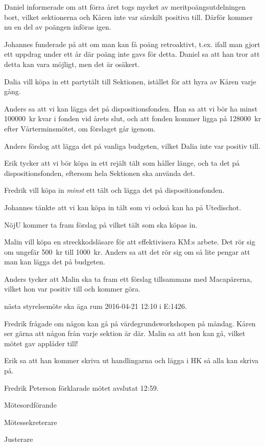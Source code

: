 \documentclass[10pt]{article}
\def\mo{Fredrik Peterson}
\def\ms{Erik Månsson}
\def\ji{Malin Lindström}
\begin{document}
\begin{paragrafer}
Daniel informerade om att förra året togs mycket av meritpoängsutdelningen bort, vilket sektionerna och Kåren inte var särskilt positiva till. Därför kommer nu en del av poängen införas igen.

Johannes funderade på att om man kan få poäng retroaktivt, t.ex. ifall man gjort ett uppdrag under ett år där poäng inte gavs för detta. Daniel sa att han tror att detta kan vara möjligt, men det är osäkert.

Dalia vill köpa in ett partytält till Sektionen, istället för att hyra av Kåren varje gång.

Anders sa att vi kan lägga det på dispositionsfonden. Han sa att vi bör ha minst \SI{100000}{kr} kvar i fonden vid årets slut, och att fonden kommer ligga på \SI{128000}{kr} efter Vårterminsmötet, om förslaget går igenom.

Anders förslog att lägga det på vanliga budgeten, vilket Dalia inte var positiv till.

Erik tycker att vi bör köpa in ett rejält tält som håller länge, och ta det på dispositionsfonden, eftersom hela Sektionen ska använda det.

Fredrik vill köpa in \emph{minst} ett tält och lägga det på dispositionsfonden.

Johannes tänkte att vi kan köpa in tält som vi också kan ha på Utedischot.

NöjU kommer ta fram förslag på vilket tält som ska köpas in.

Malin vill köpa en streckkodsläsare för att effektivisera KM:s arbete. Det rör sig om ungefär \SI{500}{kr} till \SI{1000}{kr}. Anders sa att det rör sig om så lite pengar att man kan lägga det på budgeten.

Anders tycker att Malin ska ta fram ett förslag tillsammans med Macapärerna, vilket hon var positiv till och kommer göra.

\Mba nästa styrelsemöte ska äga rum 2016-04-21 12:10 i E:1426.

\Ibfu

Fredrik frågade om någon kan gå på värdegrundsworkshopen på måndag. Kåren ser gärna att någon från varje sektion är där. Malin sa att hon kan gå, vilket mötet gav applåder till!

Erik sa att han kommer skriva ut handlingarna och lägga i HK så alla kan skriva på.

{\mo} förklarade mötet avslutat 12:59.

\end{paragrafer}

\hidesignfoot
\begin{signatures}{3}
\signature{\mo}{Mötesordförande}
\signature{\ms}{Mötessekreterare}
\signature{\ji}{Justerare}
\end{signatures}
\end{document}
